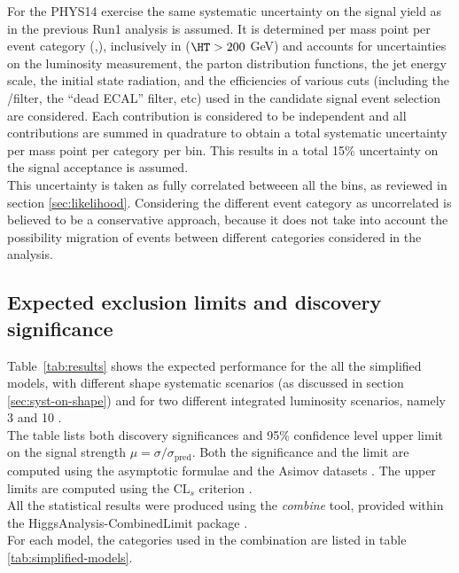 For the PHYS14 exercise the same systematic uncertainty on the signal yield 
as in the previous Run1 analysis is assumed. 
It is determined per mass 
point per event category (\njet,\nb), inclusively in \HT ($\HT > 200$ GeV) and accounts for 
uncertainties on the luminosity measurement, the parton distribution
functions, the jet energy scale, the initial state radiation, and the
efficiencies of various cuts (including the \mht/\met filter, the ``dead ECAL'' filter, etc) 
used in the candidate signal event selection are considered. 
Each contribution is considered to be independent and all contributions are
summed in quadrature to obtain a total systematic uncertainty per mass
point per category per \scalht bin. This results in a total 15\% uncertainty on the signal
acceptance is assumed. \\
This uncertainty is taken as fully correlated betweeen all the bins, as reviewed in section \ref{sec:likelihood}. 
Considering the different event category as uncorrelated is believed to be a conservative approach, 
because it does not take into account the possibility migration of events between different categories considered in the analysis. 


\subsection{Expected exclusion limits and discovery significance}
\label{subsec:susy_results}

Table~\ref{tab:results} shows
the expected performance for the all the simplified models, 
with different shape systematic scenarios (as discussed in section \ref{sec:syst-on-shape}) 
and for two different integrated luminosity scenarios, namely 3 \ifb and 10 \ifb. \\
The table lists both discovery significances and 95\% confidence level upper limit 
on the signal strength $\mu = \sigma/\sigma_{\text{pred}}$. 
Both the significance and the limit are computed using the asymptotic formulae and the Asimov datasets \cite{AsymptoticFormulae}. 
The upper limits are computed using the $\text{CL}_{s}$ criterion \cite{CLsTechnique}. \\
All the statistical results were produced using the \textit{combine} tool, 
provided within the HiggsAnalysis-CombinedLimit package \cite{Combine}. \\
For each model, the categories used in the combination are listed in table \ref{tab:simplified-models}. 

